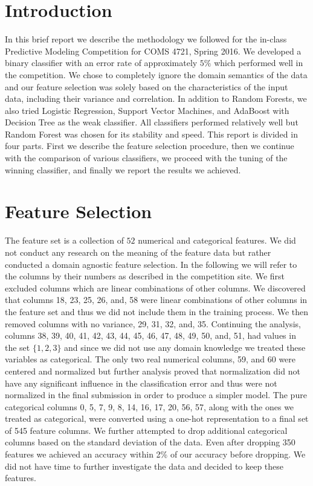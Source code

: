 \documentclass[twoside,11pt]{homework}
\begin{document}
\maketitle

\section*{Introduction}

In this brief report we describe the methodology we followed for the in-class Predictive Modeling Competition for COMS 4721, Spring 2016. We developed a binary classifier with an error rate of approximately $5\%$ which performed well in the competition. We chose to completely ignore the domain semantics of the data and our feature selection was solely based on the
characteristics of the input data, including their variance and correlation. In addition to Random Forests, we also tried Logistic Regression, Support Vector Machines, and AdaBoost with Decision Tree as the weak classifier. All classifiers performed relatively well but Random Forest was chosen for its stability and speed. This report is divided in four parts. First we describe the feature selection procedure, then we continue with the comparison of various classifiers, we proceed with the tuning of the winning classifier, and finally we report the results we achieved. 


\section*{Feature Selection}


The feature set is a collection of $52$ numerical and categorical features. We did not conduct any research on the meaning of the feature data but rather conducted a domain agnostic feature selection. In the following we will refer to the columns by their numbers as described in the competition site. We first excluded columns which are linear combinations of other columns. We discovered that columns 18, 23, 25, 26, and, 58 were linear combinations of other columns in the feature set and thus we did not include them in the training process. We then removed columns with no variance, 29, 31, 32, and, 35. Continuing the analysis, columns 38, 39, 40, 41, 42, 43, 44, 45, 46, 47, 48, 49, 50, and, 51, had values in the set $\{1,2,3\}$ and since we did not use any domain knowledge we treated these variables as categorical. The only two real numerical columns, 59, and 60 were centered and normalized but further analysis proved that normalization did not have any significant influence in the classification error and thus were not normalized in the final submission in order to produce a simpler model. The pure categorical columns 0, 5, 7, 9, 8, 14, 16, 17, 20, 56, 57,  along with the ones we treated as categorical, were converted using a one-hot representation to a final set of 545 feature columns. We further attempted to drop additional categorical columns based on the standard deviation of the data. Even after dropping 350 features we achieved an accuracy within 2\% of our accuracy before dropping. We did not have time to further investigate the data and decided to keep these features.
\end{document}
